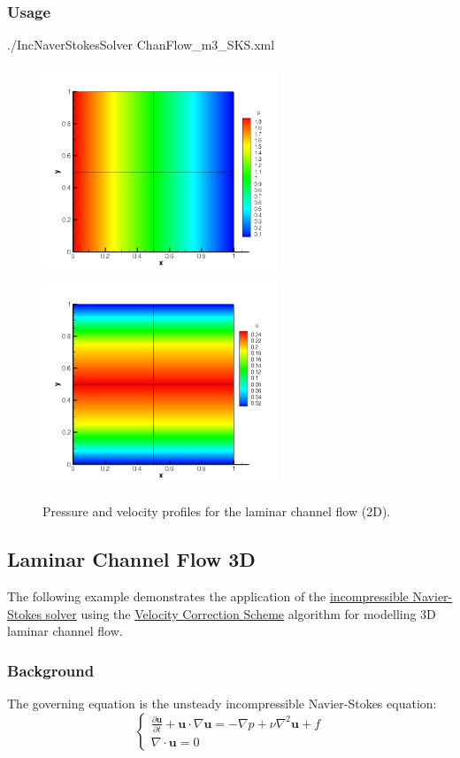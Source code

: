 \subsubsection{Usage}
./IncNaverStokesSolver ChanFlow\_m3\_SKS.xml

\begin{figure}
\begin{center}
\includegraphics[width=7cm]{Figures/CF2DSKP3PR.png}
\includegraphics[width=7cm]{Figures/CF2DSKP3.png}
\caption{Pressure and velocity profiles for the laminar channel flow (2D).}
\end{center}
\end{figure}

\subsection{Laminar Channel Flow 3D}
The following example demonstrates the application of the \hyperref[IncNSsolver]{incompressible Navier-Stokes solver} using the \hyperref[VCSscheme]{Velocity Correction Scheme} algorithm for modelling 3D laminar channel flow.

\subsubsection{Background}
The governing equation is the unsteady incompressible Navier-Stokes equation:
\begin{equation}
\begin{cases}
\frac{\partial \textbf{u}}{\partial t} + \textbf{u} \cdot \nabla \textbf{u} = - \nabla p + \nu \nabla^2 \textbf{u} + f \\
\nabla \cdot \textbf{u} = 0
\end{cases}
\end{equation}

